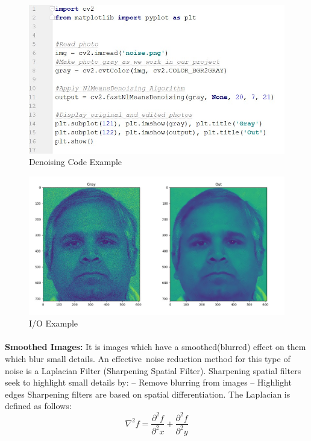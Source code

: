 \begin{figure}[H]
	\centering
	\includegraphics[width=\linewidth]{images/Denoising_code.jpg}
	\caption{Denoising Code Example}
\end{figure}

\begin{figure}[H]
	\centering
	\includegraphics[width=\linewidth]{images/gaussian.jpg}
	\caption{I/O Example}
\end{figure}

\paragraph{}
\textbf{Smoothed Images:}\newline
It is images which have a smoothed(blurred) effect on them which blur small details.\newline
An effective noise reduction method for this type of noise is a Laplacian Filter (Sharpening Spatial Filter).\newline
Sharpening spatial filters seek to highlight small details by:\newline
– Remove blurring from images\newline
– Highlight edges\newline
Sharpening filters are based on spatial differentiation.\newline
The Laplacian is defined as follows:\newline
\[\nabla^{2} f = \frac{\partial^{2}f}{\partial^{2}x} + \frac{\partial^{2}f}{\partial^{2}y}\]

